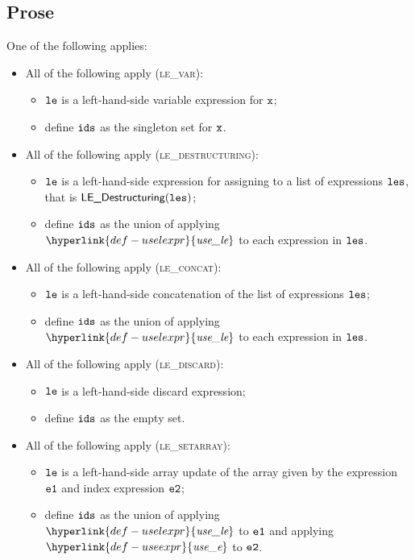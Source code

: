 \documentclass{book}
\newcommand\useexpr[0]{\hyperlink{def-useexpr}{\textfunc{use\_e}}}
\newcommand\uselexpr[0]{\hyperlink{def-uselexpr}{\textfunc{use\_le}}}
\begin{document}
\subsection{Prose}
One of the following applies:
\begin{itemize}
  \item All of the following apply (\textsc{le\_var}):
  \begin{itemize}
    \item $\texttt{le}$ is a left-hand-side variable expression for $\texttt{x}$;
    \item define $\texttt{ids}$ as the singleton set for $\texttt{x}$.
  \end{itemize}

  \item All of the following apply (\textsc{le\_destructuring}):
  \begin{itemize}
    \item $\texttt{le}$ is a left-hand-side expression for assigning to a list of expressions $\texttt{les}$,
          that is $\textsf{LE\_Destructuring}(\texttt{les})$;
    \item define $\texttt{ids}$ as the union of applying $\uselexpr$ to each expression in $\texttt{les}$.
  \end{itemize}

  \item All of the following apply (\textsc{le\_concat}):
  \begin{itemize}
    \item $\texttt{le}$ is a left-hand-side concatenation of the list of expressions $\texttt{les}$;
    \item define $\texttt{ids}$ as the union of applying $\uselexpr$ to each expression in $\texttt{les}$.
  \end{itemize}

  \item All of the following apply (\textsc{le\_discard}):
  \begin{itemize}
    \item $\texttt{le}$ is a left-hand-side discard expression;
    \item define $\texttt{ids}$ as the empty set.
  \end{itemize}

  \item All of the following apply (\textsc{le\_setarray}):
  \begin{itemize}
    \item $\texttt{le}$ is a left-hand-side array update of the array given by the expression $\texttt{e1}$ and index expression $\texttt{e2}$;
    \item define $\texttt{ids}$ as the union of applying $\uselexpr$ to $\texttt{e1}$ and applying $\useexpr$ to $\texttt{e2}$.
  \end{itemize}


\end{itemize}
\end{document}
